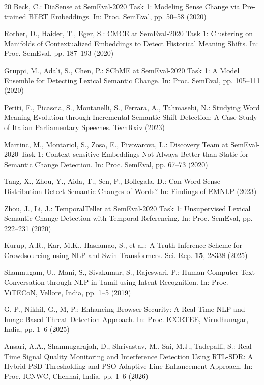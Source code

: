 \documentclass{llncs}
\begin{document}
\begin{thebibliography}{20}
Beck, C.: DiaSense at SemEval-2020 Task 1: Modeling Sense Change via Pre-trained BERT Embeddings. In: Proc. SemEval, pp. 50--58 (2020)

Rother, D., Haider, T., Eger, S.: CMCE at SemEval-2020 Task 1: Clustering on Manifolds of Contextualized Embeddings to Detect Historical Meaning Shifts. In: Proc. SemEval, pp. 187--193 (2020)

Gruppi, M., Adali, S., Chen, P.: SChME at SemEval-2020 Task 1: A Model Ensemble for Detecting Lexical Semantic Change. In: Proc. SemEval, pp. 105--111 (2020)

Periti, F., Picascia, S., Montanelli, S., Ferrara, A., Tahmasebi, N.: Studying Word Meaning Evolution through Incremental Semantic Shift Detection: A Case Study of Italian Parliamentary Speeches. TechRxiv (2023)

Martinc, M., Montariol, S., Zosa, E., Pivovarova, L.: Discovery Team at SemEval-2020 Task 1: Context-sensitive Embeddings Not Always Better than Static for Semantic Change Detection. In: Proc. SemEval, pp. 67--73 (2020)

Tang, X., Zhou, Y., Aida, T., Sen, P., Bollegala, D.: Can Word Sense Distribution Detect Semantic Changes of Words? In: Findings of EMNLP (2023)

Zhou, J., Li, J.: TemporalTeller at SemEval-2020 Task 1: Unsupervised Lexical Semantic Change Detection with Temporal Referencing. In: Proc. SemEval, pp. 222--231 (2020)

Kurup, A.R., Kar, M.K., Hashunao, S., et al.: A Truth Inference Scheme for Crowdsourcing using NLP and Swin Transformers. Sci. Rep. \textbf{15}, 28338 (2025)

Shanmugam, U., Mani, S., Sivakumar, S., Rajeswari, P.: Human-Computer Text Conversation through NLP in Tamil using Intent Recognition. In: Proc. ViTECoN, Vellore, India, pp. 1--5 (2019)

G, P., Nikhil, G., M, P.: Enhancing Browser Security: A Real-Time NLP and Image-Based Threat Detection Approach. In: Proc. ICCRTEE, Virudhunagar, India, pp. 1--6 (2025)

Ansari, A.A., Shanmugarajah, D., Shrivastav, M., Sai, M.J., Tadepalli, S.: Real-Time Signal Quality Monitoring and Interference Detection Using RTL-SDR: A Hybrid PSD Thresholding and PSO-Adaptive Line Enhancement Approach. In: Proc. ICNWC, Chennai, India, pp. 1--6 (2026)

\end{thebibliography}
\end{document}
